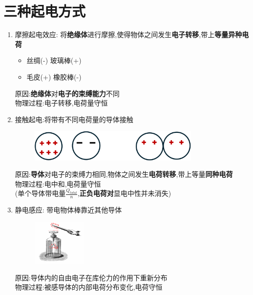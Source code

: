 \documentclass{article}
\begin{document}
\section{三种起电方式}
\begin{enumerate}
    \item 摩擦起电效应: 将\textbf{绝缘体}进行摩擦,使得物体之间发生\textbf{电子转移},带上\textbf{等量异种电荷}
          \begin{itemize}[label={}]
              \item 丝绸(-) 玻璃棒(+)
              \item 毛皮(+) 橡胶棒(-)
          \end{itemize}
          原因:\textbf{绝缘体}对\textbf{电子的束缚能力}不同   \\
          物理过程:电子转移,电荷量守恒

    \item 接触起电:将带有不同电荷量的导体接触
          \begin{figure}[h]
              \centering
              \includegraphics[width=0.8\textwidth]{./pictures/1.png}
          \end{figure}

          原因:\textbf{导体}对电子的束缚力相同,物体之间发生\textbf{电荷转移},带上等量\textbf{同种电荷}  \\
          物理过程:电中和,电荷量守恒  \\
          (单个导体带电量$\frac{Q_{total}}{n}$,\textbf{正负电荷对}显电中性并未消失)

          \newpage

    \item 静电感应: 带电物体棒靠近其他导体
          \begin{figure}[h]
              \centering
              \includegraphics[width=0.25\textwidth]{./pictures/2.png}
          \end{figure}

          原因:导体内的自由电子在库伦力的作用下重新分布 \\
          物理过程:被感导体的内部电荷分布变化,电荷守恒
\end{enumerate}
\end{document}
